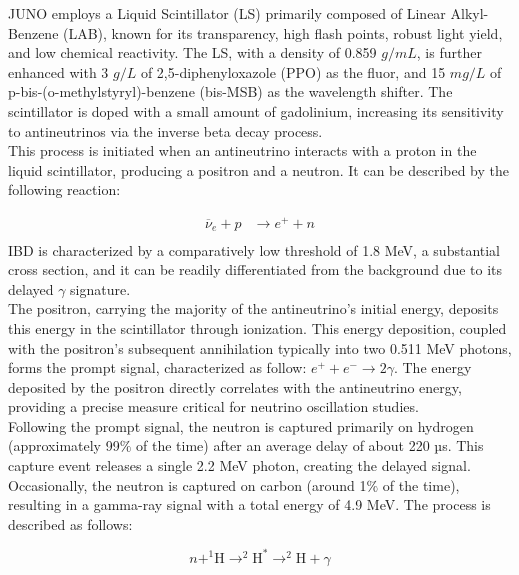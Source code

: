 JUNO employs a Liquid Scintillator (LS) primarily composed of Linear Alkyl-Benzene (LAB), known for its transparency, high flash points, robust light yield, and low chemical reactivity. The LS, with a density of 0.859 $g/mL$, is further enhanced with 3 $g/L$ of 2,5-diphenyloxazole (PPO) as the fluor, and 15 $mg/L$ of p-bis-(o-methylstyryl)-benzene (bis-MSB) as the wavelength shifter. The scintillator is doped with a small amount of gadolinium, increasing its sensitivity to antineutrinos via the inverse beta decay process.\\

This process is initiated when an antineutrino interacts with a proton in the liquid scintillator, producing a positron and a neutron. It can be described by the following reaction:

\begin{equation}
	\begin{aligned}
		\overline{\nu}_e + p &\rightarrow e^+ + n \\
	\end{aligned}
\end{equation} 
IBD is characterized by a comparatively low threshold of 1.8 MeV, a substantial cross section, and it can be readily differentiated from the background due to its delayed $\gamma$ signature.\\

The positron, carrying the majority of the antineutrino's initial energy, deposits this energy in the scintillator through ionization. This energy deposition, coupled with the positron's subsequent annihilation typically into two 0.511 MeV photons, forms the prompt signal, characterized as follow: $e^{+} + e^{-} \rightarrow 2\gamma$.
The energy deposited by the positron directly correlates with the antineutrino energy, providing a precise measure critical for neutrino oscillation studies.\\

Following the prompt signal, the neutron is captured primarily on hydrogen (approximately 99$\%$ of the time) after an average delay of about 220 µs. This capture event releases a single 2.2 MeV photon, creating the delayed signal. Occasionally, the neutron is captured on carbon (around 1$\%$ of the time), resulting in a gamma-ray signal with a total energy of 4.9 MeV. The process is described as follows:

\begin{equation}
	 n + ^{1}\text{H} \rightarrow ^{2}\text{H}^{*} \rightarrow ^2\text{H} + \gamma
\end{equation}
 
